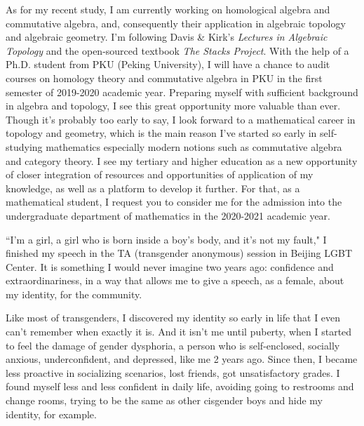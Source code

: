 \documentclass[10pt]{article}
\begin{document}
\begin{CJK*}{UTF8}{gbsn}
As for my recent study, I am currently working on homological algebra and commutative algebra, and, consequently their application in algebraic topology and algebraic geometry. I'm following Davis \& Kirk's \textit{Lectures in Algebraic Topology} and the open-sourced textbook \textit{The Stacks Project}. With the help of a Ph.D. student from PKU (Peking University), I will have a chance to audit courses on homology theory and commutative algebra in PKU in the first semester of 2019-2020 academic year. Preparing myself with sufficient background in algebra and topology, I see this great opportunity more valuable than ever. Though it's probably too early to say, I look forward to a mathematical career in topology and geometry, which is the main reason I've started so early in self-studying mathematics especially modern notions such as commutative algebra and category theory. I see my tertiary and higher education as a new opportunity of closer integration of resources and opportunities of application of my knowledge, as well as a platform to develop it further. For that, as a mathematical student, I request you to consider me for the admission into the undergraduate department of mathematics in the 2020-2021 academic year.

\newpage
``I'm a girl, a girl who is born inside a boy's body, and it's not my fault," I finished my speech in the TA (transgender anonymous) session in Beijing LGBT Center. It is something I would never imagine two years ago: confidence and extraordinariness, in a way that allows me to give a speech, as a female, about my identity, for the community.

Like most of transgenders, I discovered my identity so early in life that I even can't remember when exactly it is. And it isn't me until puberty, when I started to feel the damage of gender dysphoria, a person who is self-enclosed, socially anxious, underconfident, and depressed, like me 2 years ago. Since then, I became less proactive in socializing scenarios, lost friends, got unsatisfactory grades. I found myself less and less confident in daily life, avoiding going to restrooms and change rooms, trying to be the same as other cisgender boys and hide my identity, for example.


\end{CJK*}
\end{document}
